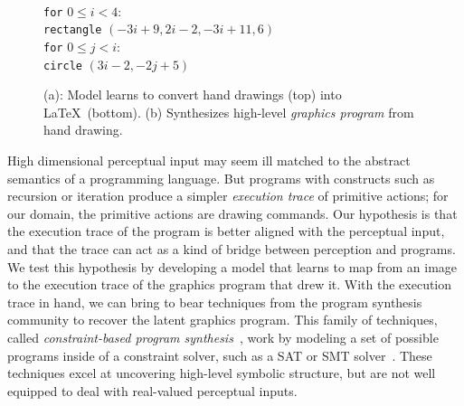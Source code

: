 \documentclass{article}
\begin{document}
\begin{figure}[h]
\begin{minipage}[t]{0.7\linewidth}
\begin{tabular}{llll}
\end{tabular}
\subcaption{}
  \end{minipage}%
  \begin{minipage}[t]{0.3\linewidth}
    \\
    \texttt{for} $0\leq i < 4$:\\
    \texttt{rectangle} $(-3i + 9,2i - 2, -3i + 11,6)$\\
    \texttt{for} $0\leq j < i$:\\
    \texttt{circle} $(3i-2,-2j+5)$\\
    \subcaption{}
  \end{minipage}
  \caption{(a): Model learns to convert hand drawings (top) into \LaTeX~(bottom). (b) Synthesizes high-level \emph{graphics program} from hand drawing.}\label{firstPageExamples}
  \end{figure}

High dimensional perceptual input may seem ill matched to the abstract
semantics of a programming language. But programs with constructs such as
recursion or iteration produce a simpler \emph{execution trace} of
primitive actions; for our domain, the primitive actions are drawing
commands. Our hypothesis is that the execution trace of the program is
better aligned with the perceptual input, and that the trace can act
as a kind of bridge between perception and programs. We test this
hypothesis by developing a model that learns to map from an image to
the execution trace of the graphics program that drew it.  With the
execution trace in hand, we can bring to bear techniques from the
program synthesis community to recover the latent graphics program.
This family of techniques, called \emph{constraint-based program synthesis}~\cite{solar2008program},
work by modeling a set of possible programs inside of a constraint solver,
such as a SAT or SMT solver~\cite{de2008z3}.
These techniques excel at uncovering high-level symbolic structure,
but are not well equipped to deal with real-valued perceptual inputs.
\end{document}
